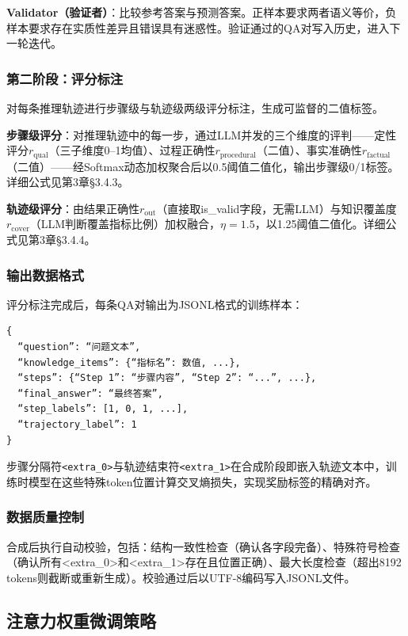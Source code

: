 \documentclass[professional,privacy,print,win,long,STEM,AutoFakeBold]{def/buaa}
\begin{document}
\textbf{Validator（验证者）}：比较参考答案与预测答案。正样本要求两者语义等价，负样本要求存在实质性差异且错误具有迷惑性。验证通过的QA对写入历史，进入下一轮迭代。

\subsubsection{第二阶段：评分标注}

对每条推理轨迹进行步骤级与轨迹级两级评分标注，生成可监督的二值标签。

\textbf{步骤级评分}：对推理轨迹中的每一步，通过LLM并发的三个维度的评判——定性评分\(r_{\mathrm{qual}}\)（三子维度0--1均值）、过程正确性\(r_{\mathrm{procedural}}\)（二值）、事实准确性\(r_{\mathrm{factual}}\)（二值）——经Softmax动态加权聚合后以0.5阈值二值化，输出步骤级0/1标签。详细公式见第3章§3.4.3。

\textbf{轨迹级评分}：由结果正确性\(r_{\mathrm{out}}\)（直接取is\_valid字段，无需LLM）与知识覆盖度\(r_{\mathrm{cover}}\)（LLM判断覆盖指标比例）加权融合，\(\eta=1.5\)，以1.25阈值二值化。详细公式见第3章§3.4.4。

\subsubsection{输出数据格式}

评分标注完成后，每条QA对输出为JSONL格式的训练样本：

\begin{verbatim}
{
  “question”: “问题文本”,
  “knowledge_items”: {“指标名”: 数值, ...},
  “steps”: {“Step 1”: “步骤内容”, “Step 2”: “...”, ...},
  “final_answer”: “最终答案”,
  “step_labels”: [1, 0, 1, ...],
  “trajectory_label”: 1
}
\end{verbatim}

步骤分隔符\verb|<extra_0>|与轨迹结束符\verb|<extra_1>|在合成阶段即嵌入轨迹文本中，训练时模型在这些特殊token位置计算交叉熵损失，实现奖励标签的精确对齐。

\subsubsection{数据质量控制}

合成后执行自动校验，包括：结构一致性检查（确认各字段完备）、特殊符号检查（确认所有<extra\_0>和<extra\_1>存在且位置正确）、最大长度检查（超出8192 tokens则截断或重新生成）。校验通过后以UTF-8编码写入JSONL文件。

\subsection{注意力权重微调策略}
\end{document}
